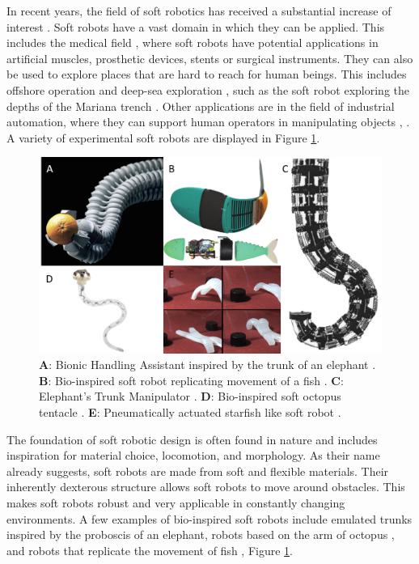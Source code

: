 \label{chapter1}

In recent years, the field of soft robotics has received a substantial increase of interest \cite{iida2011soft}\cite{walker2020soft} \cite{bao2018soft}. Soft robots have a vast domain in which they can be applied. This includes the medical field \cite{sitti2018miniature} \cite{ashuri2020biomedical}, where soft robots have potential applications in artificial muscles, prosthetic devices, stents or surgical instruments. They can also be used to explore places that are hard to reach for human beings. This includes offshore operation and deep-sea exploration \cite{aracri2021soft}, such as the soft robot exploring the depths of the Mariana trench \cite{laschi2021soft}. Other applications are in the field of industrial automation, where they can support human operators in manipulating objects \cite{george2018control}, \cite{grissom2006design}. A variety of experimental soft robots are displayed in Figure \ref{fig1:softexample}. 



\begin{figure}[H]       
    \centering
    \includegraphics[width = \textwidth]{Figures/Chapter1/robotexamples.png}
    \caption{\textbf{A}: Bionic Handling Assistant inspired by the trunk of an elephant \cite{BHA}. \textbf{B}: Bio-inspired soft robot replicating movement of a fish \cite{marchese2014}. \textbf{C}: Elephant’s Trunk Manipulator \cite{hannan2003kinematics}. \textbf{D}: Bio-inspired soft octopus tentacle \cite{laschi2012soft}. \textbf{E}: Pneumatically actuated starfish like soft robot \cite{shepherd2011multigait}.}
    \label{fig1:softexample}
\end{figure}


The foundation of soft robotic design is often found in nature and includes inspiration for material choice, locomotion, and morphology. As their name already suggests, soft robots are made from soft and flexible materials. Their inherently dexterous structure allows soft robots to move around obstacles. This makes soft robots robust and very applicable in constantly changing environments. A few examples of bio-inspired soft robots include emulated trunks \cite{hannan2003kinematics} inspired by the proboscis of an elephant, robots based on the arm of octopus \cite{wang2013visual}, and robots that replicate the movement of fish \cite{marchese2014}, Figure \ref{fig1:softexample}. 



